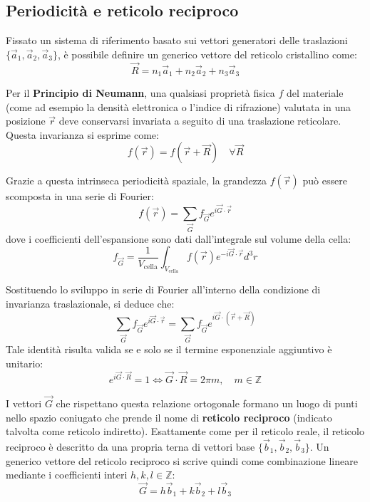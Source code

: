 \subsection{Periodicità e reticolo reciproco}

Fissato un sistema di riferimento basato sui vettori generatori delle traslazioni \( \{\vec{a}_1, \vec{a}_2, \vec{a}_3\} \), è possibile definire un generico vettore del reticolo cristallino come:
\begin{equation}
    \vec{R} = n_1\vec{a}_1 + n_2\vec{a}_2 + n_3\vec{a}_3
\end{equation}

Per il \textbf{Principio di Neumann}, una qualsiasi proprietà fisica \( f \) del materiale (come ad esempio la densità elettronica o l'indice di rifrazione) valutata in una posizione \( \vec{r} \) deve conservarsi invariata a seguito di una traslazione reticolare. Questa invarianza si esprime come:
\begin{equation}
    f(\vec{r}) = f(\vec{r} + \vec{R}) \quad \forall \vec{R}
\end{equation}

Grazie a questa intrinseca periodicità spaziale, la grandezza \( f(\vec{r}) \) può essere scomposta in una serie di Fourier:
\begin{equation}
    f(\vec{r}) = \sum_{\vec{G}} f_{\vec{G}} e^{i \vec{G} \cdot \vec{r}}
\end{equation}
dove i coefficienti dell'espansione sono dati dall'integrale sul volume della cella:
\begin{equation}
    f_{\vec{G}} = \frac{1}{V_{\text{cella}}} \int_{V_{\text{cella}}} f(\vec{r}) e^{-i \vec{G} \cdot \vec{r}} d^3r
\end{equation}

Sostituendo lo sviluppo in serie di Fourier all'interno della condizione di invarianza traslazionale, si deduce che:
\begin{equation}
    \sum_{\vec{G}} f_{\vec{G}} e^{i \vec{G} \cdot \vec{r}} = \sum_{\vec{G}} f_{\vec{G}} e^{i \vec{G} \cdot (\vec{r} + \vec{R})}
\end{equation}
Tale identità risulta valida se e solo se il termine esponenziale aggiuntivo è unitario:
\begin{equation}
    e^{i \vec{G} \cdot \vec{R}} = 1 \iff \vec{G} \cdot \vec{R} = 2\pi m, \quad m \in \mathbb{Z}
\end{equation}

I vettori \( \vec{G} \) che rispettano questa relazione ortogonale formano un luogo di punti nello spazio coniugato che prende il nome di \textbf{reticolo reciproco} (indicato talvolta come reticolo indiretto). 
Esattamente come per il reticolo reale, il reticolo reciproco è descritto da una propria terna di vettori base \( \{\vec{b}_1, \vec{b}_2, \vec{b}_3\} \). Un generico vettore del reticolo reciproco si scrive quindi come combinazione lineare mediante i coefficienti interi \( h, k, l \in \mathbb{Z} \):
\begin{equation}
    \vec{G} = h\vec{b}_1 + k\vec{b}_2 + l\vec{b}_3
\end{equation}

